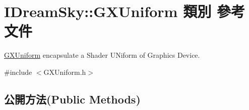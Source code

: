 \hypertarget{class_i_dream_sky_1_1_g_x_uniform}{}\section{I\+Dream\+Sky\+:\+:G\+X\+Uniform 類別 參考文件}
\label{class_i_dream_sky_1_1_g_x_uniform}


\hyperlink{class_i_dream_sky_1_1_g_x_uniform}{G\+X\+Uniform} encapsulate a Shader U\+Niform of Graphics Device.  




{\ttfamily \#include $<$G\+X\+Uniform.\+h$>$}

\subsection*{公開方法(Public Methods)}
